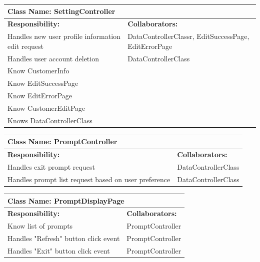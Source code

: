 \documentclass[]{article}
\begin{document}
	\begin{table}[H]
	\centering
	\begin{tabular}{|p{6cm}|p{6cm}|}
	\hline 
		\multicolumn{2}{|l|}{\textbf{Class Name: SettingController}} \\
	\hline
	\textbf{Responsibility:} & \textbf{Collaborators:} \\
	\hline
	Handles new user profile information edit request & DataControllerClassr, EditSuccessPage, EditErrorPage\\ \hline
	Handles user account deletion & DataControllerClass\\ \hline
	Know CustomerInfo & \\ \hline 
	Know EditSuccessPage & \\ \hline 
	Know EditErrorPage & \\ \hline
	Know CustomerEditPage & \\ \hline
	Knows DataControllerClass& \\ \hline
	\end{tabular}
	\end{table}
	
	\begin{table}[H]
	\centering
	\begin{tabular}{|p{6cm}|p{6cm}|}
	\hline 
		\multicolumn{2}{|l|}{\textbf{Class Name: PromptController}} \\
	\hline
	\textbf{Responsibility:} & \textbf{Collaborators:} \\
	\hline
	Handles exit prompt request & DataControllerClass\\ \hline
	Handles prompt list request based on user preference & DataControllerClass\\ \hline
	\end{tabular}
	\end{table}

	\begin{table}[H]
	\centering
	\begin{tabular}{|p{6cm}|p{6cm}|}
	\hline 
		\multicolumn{2}{|l|}{\textbf{Class Name: PromptDisplayPage}} \\
	\hline
	\textbf{Responsibility:} & \textbf{Collaborators:} \\
	\hline
	Know list of prompts & PromptController\\ \hline
	Handles "Refresh" button click event  & PromptController\\ \hline
	Handles "Exit" button click event  & PromptController \\ \hline
	\end{tabular}
	\end{table}
\end{document}
